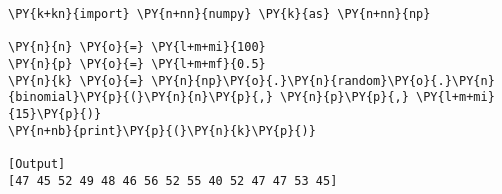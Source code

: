 \begin{Verbatim}[label=\makebox{\href{https://bitbucket.org/lbaldini/statnotes/src/master/snippets/np.random.binomial.py}{https://bitbucket.org/.../np.random.binomial.py}},commandchars=\\\{\}]
\PY{k+kn}{import} \PY{n+nn}{numpy} \PY{k}{as} \PY{n+nn}{np}

\PY{n}{n} \PY{o}{=} \PY{l+m+mi}{100}
\PY{n}{p} \PY{o}{=} \PY{l+m+mf}{0.5}
\PY{n}{k} \PY{o}{=} \PY{n}{np}\PY{o}{.}\PY{n}{random}\PY{o}{.}\PY{n}{binomial}\PY{p}{(}\PY{n}{n}\PY{p}{,} \PY{n}{p}\PY{p}{,} \PY{l+m+mi}{15}\PY{p}{)}
\PY{n+nb}{print}\PY{p}{(}\PY{n}{k}\PY{p}{)}

[Output]
[47 45 52 49 48 46 56 52 55 40 52 47 47 53 45]
\end{Verbatim}